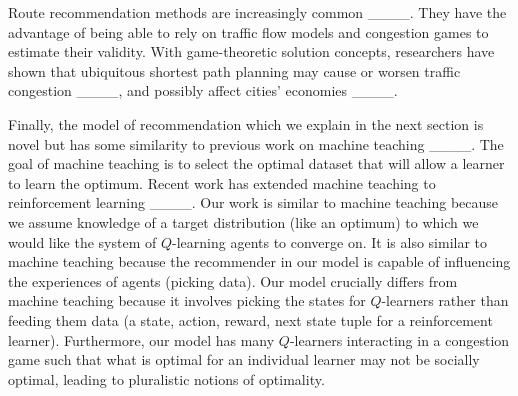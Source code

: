 Route recommendation methods are increasingly common ____. They have the advantage of being able to rely on traffic flow models and congestion games to estimate their validity. With game-theoretic solution concepts, researchers have shown that ubiquitous shortest path planning may cause or worsen traffic congestion ____, and possibly affect cities' economies ____. 

Finally, the model of recommendation which we explain in the next section is novel but has some similarity to previous work on machine teaching ____. The goal of machine teaching is to select the optimal dataset that will allow a learner to learn the optimum. Recent work has extended machine teaching to reinforcement learning ____. Our work is similar to machine teaching because we assume knowledge of a target distribution (like an optimum) to which we would like the system of $Q$-learning agents to converge on. It is also similar to machine teaching because the recommender in our model is capable of influencing the experiences of agents (picking data). Our model crucially differs from machine teaching because it involves picking the states for $Q$-learners rather than feeding them data (a state, action, reward, next state tuple for a reinforcement learner). Furthermore, our model has many $Q$-learners interacting in a congestion game such that what is optimal for an individual learner may not be socially optimal, leading to pluralistic notions of optimality.